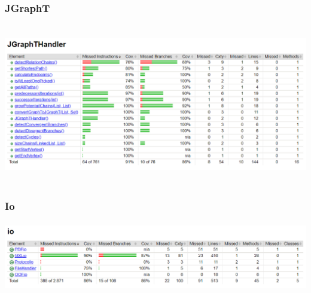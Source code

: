 \documentclass[enabledeprecatedfontcommands]{scrartcl}
\begin{document}
\subsubsection{JGraphT}
\begin{center}
\includegraphics[height=7cm]{jgraphthandler-testcoverage.png}
\end{center}
\subsubsection{Io}
\begin{center}
\includegraphics[height=3cm]{io-testcoverage.png}
\end{center}
\end{document}
